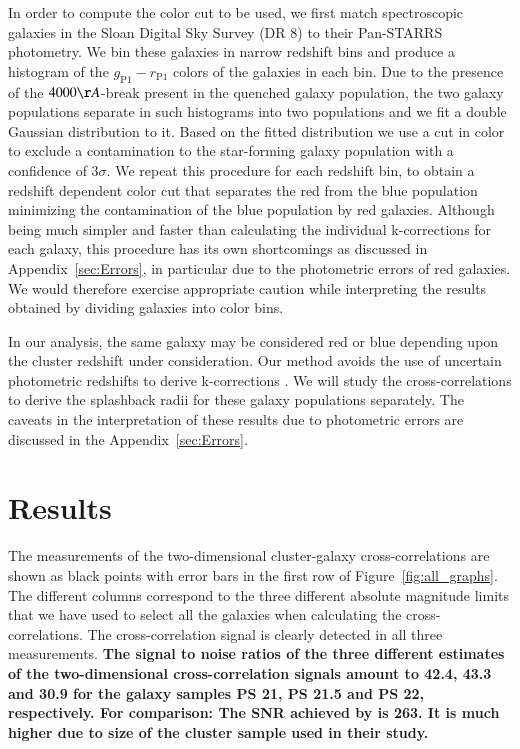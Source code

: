 \documentclass[iop, apjl, twocolappendix, numberedappendix]{emulateapj}
\begin{document}
In order to compute the color cut to be used, we first match spectroscopic
galaxies in the Sloan Digital Sky Survey (DR 8) to their
Pan-STARRS photometry. We bin these galaxies in narrow redshift bins and
produce a histogram of the $g_{\mathrm{P1}}-r_{\mathrm{P1}}$ colors of the
galaxies in each bin. Due to the presence of the $4000\AA$-break present in the
quenched galaxy population, the two galaxy populations separate in such histograms
into two populations and we fit a double Gaussian distribution to it.
Based on the fitted distribution we use a cut in color to exclude a
contamination to the star-forming galaxy population with a confidence
of 3$\sigma$. We repeat this procedure for each redshift bin, to obtain a redshift
dependent color cut that separates the red from the blue population minimizing
the contamination of the blue population by red galaxies. Although being much
simpler and faster than calculating the individual k-corrections for each
galaxy, this procedure has its own shortcomings as discussed in
Appendix~\ref{sec:Errors}, in particular due to the photometric errors of red
galaxies. We would therefore exercise appropriate caution while interpreting
the results obtained by dividing galaxies into color bins.

In our analysis, the same galaxy may be considered red or blue depending upon
the cluster redshift under consideration. Our method avoids the use of
uncertain photometric redshifts to derive k-corrections
\citep[cf.][]{baxter2017halo}. We will study the cross-correlations to derive
the splashback radii for these galaxy populations separately. The caveats in
the interpretation of these results due to photometric errors are discussed in the
Appendix~\ref{sec:Errors}.

\section{Results}
\label{sec:Results}
The measurements of the two-dimensional cluster-galaxy
cross-correlations are shown as black points with error bars in the
first row of Figure~\ref{fig:all_graphs}. The different columns
correspond to the three different absolute magnitude limits that we
have used to select all the galaxies when calculating the
cross-correlations. The cross-correlation signal is clearly detected
in all three measurements. \textbf{The signal to noise ratios of the 
three different estimates of the two-dimensional cross-correlation 
signals amount to 42.4, 43.3 and 30.9 for the galaxy samples PS 21, 
PS 21.5 and PS 22, respectively. For comparison: 
The SNR achieved by \citet{more2016detection} is 263. It is much higher
due to size of the cluster sample used in their study.}
\end{document}
